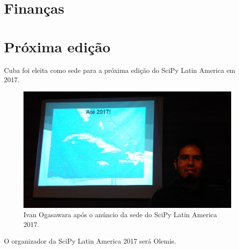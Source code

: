 \documentclass[12pt]{article}
\begin{document}
\section*{Finanças}

\clearpage
\newpage

\section*{Próxima edição}

Cuba foi eleita como sede para a próxima edição do SciPy Latin America em 2017.

\begin{figure}[!htb]
\center
\includegraphics[height=.3\textheight]{2017.jpg}
\caption{Ivan Ogasawara após o anúncio da sede do SciPy Latin America 2017.}
\end{figure}

O organizador da SciPy Latin America 2017 será Olemis.

\clearpage
\newpage
\end{document}
